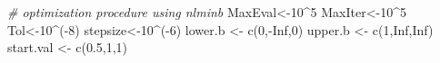 \documentclass[
]{book}
\newenvironment{Shaded}{\begin{snugshade}}{\end{snugshade}}
\newcommand{\CommentTok}[1]{\textcolor[rgb]{0.56,0.35,0.01}{\textit{#1}}}
\newcommand{\ConstantTok}[1]{\textcolor[rgb]{0.00,0.00,0.00}{#1}}
\newcommand{\DecValTok}[1]{\textcolor[rgb]{0.00,0.00,0.81}{#1}}
\newcommand{\FloatTok}[1]{\textcolor[rgb]{0.00,0.00,0.81}{#1}}
\newcommand{\FunctionTok}[1]{\textcolor[rgb]{0.00,0.00,0.00}{#1}}
\newcommand{\NormalTok}[1]{#1}
\newcommand{\OtherTok}[1]{\textcolor[rgb]{0.56,0.35,0.01}{#1}}
\newcommand{\SpecialCharTok}[1]{\textcolor[rgb]{0.00,0.00,0.00}{#1}}
\theoremstyle{definition}
\theoremstyle{definition}
\theoremstyle{definition}
\theoremstyle{definition}
\theoremstyle{remark}
\begin{document}
\begin{Shaded}
\begin{Highlighting}[]
\CommentTok{\# optimization procedure using nlminb}
\NormalTok{MaxEval}\OtherTok{\textless{}{-}}\DecValTok{10}\SpecialCharTok{\^{}}\DecValTok{5}
\NormalTok{MaxIter}\OtherTok{\textless{}{-}}\DecValTok{10}\SpecialCharTok{\^{}}\DecValTok{5}
\NormalTok{Tol}\OtherTok{\textless{}{-}}\DecValTok{10}\SpecialCharTok{\^{}}\NormalTok{(}\SpecialCharTok{{-}}\DecValTok{8}\NormalTok{)}
\NormalTok{stepsize}\OtherTok{\textless{}{-}}\DecValTok{10}\SpecialCharTok{\^{}}\NormalTok{(}\SpecialCharTok{{-}}\DecValTok{6}\NormalTok{)}
\NormalTok{lower.b }\OtherTok{\textless{}{-}} \FunctionTok{c}\NormalTok{(}\DecValTok{0}\NormalTok{,}\SpecialCharTok{{-}}\ConstantTok{Inf}\NormalTok{,}\DecValTok{0}\NormalTok{)}
\NormalTok{upper.b }\OtherTok{\textless{}{-}} \FunctionTok{c}\NormalTok{(}\DecValTok{1}\NormalTok{,}\ConstantTok{Inf}\NormalTok{,}\ConstantTok{Inf}\NormalTok{)}
\NormalTok{start.val }\OtherTok{\textless{}{-}} \FunctionTok{c}\NormalTok{(}\FloatTok{0.5}\NormalTok{,}\DecValTok{1}\NormalTok{,}\DecValTok{1}\NormalTok{)}
  

\end{Highlighting}
\end{Shaded}
\end{document}

